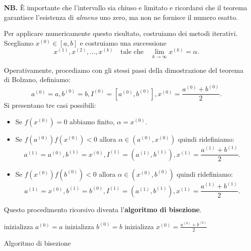 \textbf{NB.}
È importante che l'intervallo sia chiuso e limitato e ricordarsi che il teorema garantisce l'esistenza di \textit{almeno} uno zero, ma non ne fornisce il numero esatto.

Per applicare numericamente questo risultato, costruiamo dei metodi iterativi. Scegliamo $x^{(0)} \in [ a,b]$ e costruiamo una successione
$$ x^{(1)} ,x^{(2)} ,\dotsc ,x^{(k)} \quad \text{tale che} \quad \lim\limits _{k\rightarrow \infty } x^{(k)} =\alpha. $$

Operativamente, procediamo con gli stessi passi della dimostrazione del teorema di Bolzano, definiamo:
$$ a^{(0)} =a,b^{(0)} =b,I^{(0)} =\left[ a^{(0)} ,b^{(0)}\right] ,x^{(0)} =\frac{a^{(0)} +b^{(0)}}{2}.$$
Si presentano tre casi possibili:
\begin{itemize}
\item Se $f\left( x^{(0)}\right) =0$ abbiamo finito, $\alpha =x^{(0)}$.
\item Se $f\left( a^{(0)}\right) f\left( x^{(0)}\right) < 0$ allora $\alpha \in \left( a^{(0)} ,x^{(0)}\right)$ quindi ridefiniamo:
$$ a^{(1)} =a^{(0)} ,b^{(1)} =x^{(0)} ,I^{(1)} =\left( a^{(1)} ,b^{(1)}\right) ,x^{(1)} =\frac{a^{(1)} +b^{(1)}}{2}. $$
\item Se $f\left( x^{(0)}\right) f\left( b^{(0)}\right) < 0$ allora $\alpha \in \left( x^{(0)} ,b^{(0)}\right)$ quindi ridefiniamo:
$$ a^{(1)} =x^{(0)} ,b^{(1)} =b^{(0)} ,I^{(1)} =\left( a^{(1)} ,b^{(1)}\right) ,x^{(1)} =\frac{a^{(1)} +b^{(1)}}{2}. $$
\end{itemize}

Questo procedimento ricorsivo diventa l'\textbf{algoritmo di bisezione}.

\begin{algo}
	inizializza $a^{(0)} =a$\;
	inizializza $b^{(0)} =b$\;
	inizializza $x^{(0)} =\frac{a^{(0)} +b^{(0)}}{2}$\;
	\caption{Algoritmo di bisezione}
\end{algo}

